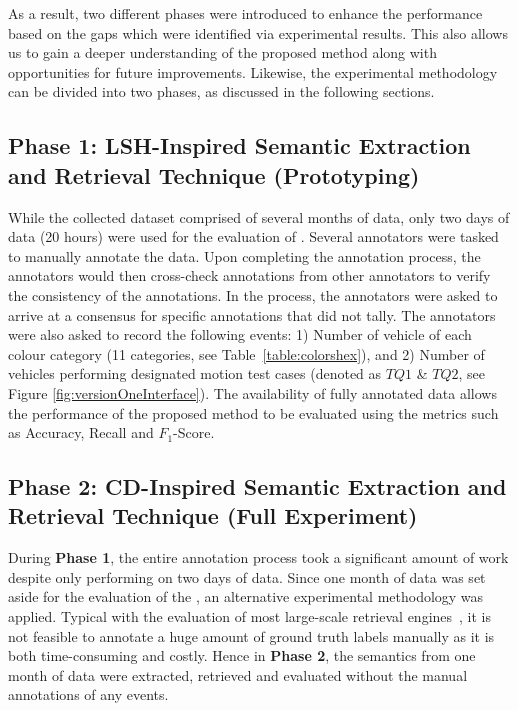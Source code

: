 As a result, two different phases were introduced to enhance the performance based on the 
gaps which were identified via experimental results. This also allows us to gain a deeper understanding of the proposed method along with opportunities for future improvements.
Likewise, the experimental methodology can be divided into two phases, as discussed in the following sections.


\vspace{1em}
\subsection{Phase 1: LSH-Inspired Semantic Extraction and Retrieval Technique (Prototyping)}
While the collected dataset comprised of several months of data, only two days of data (20 hours) were used for the evaluation of \versionOneRet. Several annotators were tasked to manually annotate the data. Upon completing the annotation process, the annotators would then cross-check annotations from other annotators to verify the consistency of the annotations.
In the process, the annotators were asked to arrive at a consensus for specific annotations that did not tally. The annotators were also asked to record the following events:
1) Number of vehicle of each colour category (11 categories, see Table~\ref{table:colorshex}), and 2) Number of vehicles performing designated motion test cases (denoted as $TQ1$ \& $TQ2$, see Figure \ref{fig:versionOneInterface}).
The availability of fully annotated data allows the performance of the proposed method to be evaluated using the metrics such as Accuracy, Recall and $F_1$-Score.

\vspace{1em}
\subsection{Phase 2: CD-Inspired Semantic Extraction and Retrieval Technique (Full Experiment)}

During \textbf{Phase 1}, the entire annotation process took a significant amount of work despite only performing on two days of data. Since one month of data was set aside for the evaluation of the \versionTwoRet, an alternative experimental methodology was applied.
Typical with the evaluation of most large-scale retrieval engines~\cite{jermsurawong2012car, zhang2013mining, castanon2016retrieval, ren2018learning}, 
it is not feasible to annotate a huge amount of ground truth labels manually as it is both %
time-consuming and costly. 
Hence in \textbf{Phase 2}, the semantics from one month of data were extracted, retrieved and evaluated without the manual annotations of any events.

